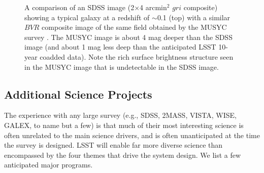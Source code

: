 \begin{figure}
\caption{
A comparison of an SDSS image (2$\times$4 arcmin$^2$ $gri$ composite) showing a typical galaxy at
a redshift of $\sim$0.1 (top) with a similar $BVR$ composite image of the same field obtained by the MUSYC survey
\citep[bottom;][]{2006ApJS..162....1G}. The MUSYC image is about 4 mag deeper than the SDSS image (and about 1 mag less deep
than the anticipated LSST 10-year coadded data). Note the rich surface brightness structure seen in the MUSYC
image that is undetectable in the SDSS image.}
\label{Fig:musyc}
\end{figure}


\subsection{  Additional Science Projects}

The experience with any large survey (e.g., SDSS, 2MASS, VISTA, WISE, GALEX, to name but a
few) is that much of their most interesting science is often unrelated to
the main science drivers, and is often unanticipated at the time the survey is
designed. LSST will enable far more diverse science than encompassed by the
four themes that drive the system design. We list a few anticipated major
programs.

